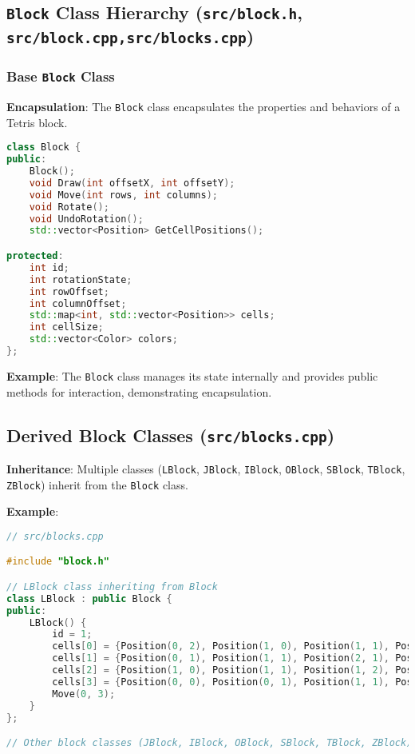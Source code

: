 \documentclass{article}
\begin{document}
\subsection{\texttt{Block} Class Hierarchy (\texttt{src/block.h}, \texttt{src/block.cpp,\texttt{src/blocks.cpp}})}
\subsubsection{Base \texttt{Block} Class}
\textbf{Encapsulation}: The \texttt{Block} class encapsulates the properties and behaviors of a Tetris block.

\begin{lstlisting}[language=C++]
class Block {
public:
    Block();
    void Draw(int offsetX, int offsetY);
    void Move(int rows, int columns);
    void Rotate();
    void UndoRotation();
    std::vector<Position> GetCellPositions();

protected:
    int id;
    int rotationState;
    int rowOffset;
    int columnOffset;
    std::map<int, std::vector<Position>> cells;
    int cellSize;
    std::vector<Color> colors;
};
\end{lstlisting}

\textbf{Example}: The \texttt{Block} class manages its state internally and provides public methods for interaction, demonstrating encapsulation.

\subsection{Derived Block Classes (\texttt{src/blocks.cpp})}

\textbf{Inheritance}: Multiple classes (\texttt{LBlock}, \texttt{JBlock}, \texttt{IBlock}, \texttt{OBlock}, \texttt{SBlock}, \texttt{TBlock}, \texttt{ZBlock}) inherit from the \texttt{Block} class.

\textbf{Example}:

\begin{lstlisting}[language=C++]
// src/blocks.cpp

#include "block.h"

// LBlock class inheriting from Block
class LBlock : public Block {
public:
    LBlock() {
        id = 1;
        cells[0] = {Position(0, 2), Position(1, 0), Position(1, 1), Position(1, 2)};
        cells[1] = {Position(0, 1), Position(1, 1), Position(2, 1), Position(2, 2)};
        cells[2] = {Position(1, 0), Position(1, 1), Position(1, 2), Position(2, 0)};
        cells[3] = {Position(0, 0), Position(0, 1), Position(1, 1), Position(2, 1)};
        Move(0, 3);
    }
};

// Other block classes (JBlock, IBlock, OBlock, SBlock, TBlock, ZBlock) defined similarly
\end{lstlisting}
\end{document}
